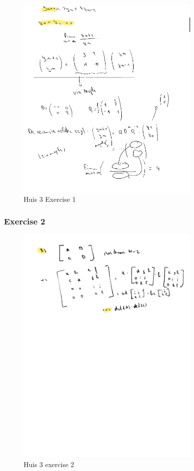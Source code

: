 \documentclass[a4paper]{report}
\begin{document}
\begin{figure}[H]
	\centering
	\includegraphics[width=0.8\textwidth]{assets/huis_3_ex_1.png}
	\caption{Huis 3 Exercise 1}
	\label{fig:huis_3_ex_1}
\end{figure}

\subsubsection{Exercise 2}

\begin{figure}[H]
	\centering
	\includegraphics[width=0.8\textwidth]{assets/huis_3_ex_2.pdf}
	\caption{Huis 3 exercise 2}
\end{figure}
\end{document}
